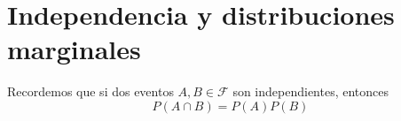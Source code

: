 \chapter{Independencia y distribuciones marginales}

Recordemos que si dos eventos $A, B \in \mathcal F$ son independientes, entonces
\[P(A \cap B) = P(A)P(B)\]
